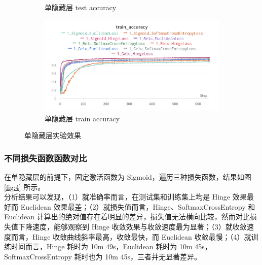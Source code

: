 \documentclass{article}
\begin{document}
\begin{figure}[htbp]
\begin{subfigure}{0.475\textwidth}
		\caption{单隐藏层 test accuracy}
	\end{subfigure}
	\begin{subfigure}{0.475\textwidth}
		\centering
		\includegraphics[width=1\textwidth]{../pics/单层实验-train_acc.png}
		\caption{单隐藏层 train accuracy}
	\end{subfigure}
	\caption{单隐藏层实验效果}
	\label{fig:3}
\end{figure}

\subsubsection{不同损失函数函数对比}

在单隐藏层的前提下，固定激活函数为 Sigmoid，遍历三种损失函数，结果如图 \ref{fig:4} 所示。\\
分析结果可以发现，（1）就准确率而言，在测试集和训练集上均是 Hinge 效果最好而 Euclidean 效果最差；（2）就损失值而言，Hinge、SoftmaxCrossEntropy 和 Euclidean 计算出的绝对值存在着明显的差异，损失值无法横向比较，然而对比损失值下降速度，能够观察到 Hinge 收敛效果与收敛速度最为显著；（3）就收敛速度而言，Hinge 收敛曲线斜率最高，收敛最快，而 Euclidean 收敛最慢；（4）就训练时间而言，Hinge 耗时为 
10m 49s，Euclidean 耗时为 10m 45s，SoftmaxCrossEntropy 耗时也为 10m 45s，三者并无显著差异。
\end{document}
